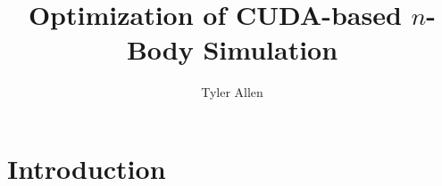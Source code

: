 \documentclass[10pt]{IEEEtran}
\newcommand{\?}{\stackrel{?}{=}}
\begin{document}
\title{Optimization of CUDA-based $n$-Body Simulation}
\date{}
\author{Tyler Allen}
\maketitle


\begin{abstract}
\end{abstract}

\section{Introduction}

\newpage

\nocite{*}
\newpage
\begin{appendices}
\onecolumn
\footnotesize
\section{}
\label{appendix:mpi}
\begin{lstlisting}[language=C++]
\end{lstlisting}

\end{appendices}
\end{document}
